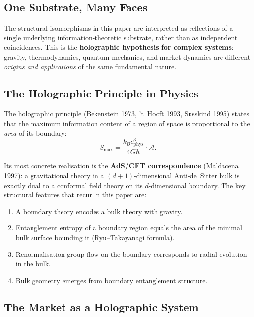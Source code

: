 \documentclass[12pt,a4paper]{article}
\begin{document}
\subsection{One Substrate, Many Faces}

The structural isomorphisms in this paper are interpreted as reflections
of a single underlying information-theoretic substrate, rather than as
independent coincidences. This is the \textbf{holographic hypothesis for
complex systems}: gravity, thermodynamics, quantum mechanics, and market
dynamics are different \emph{origins and applications} of the same
fundamental nature.

\subsection{The Holographic Principle in Physics}

The holographic principle (Bekenstein 1973, 't~Hooft 1993, Susskind 1995)
states that the maximum information content of a region of space is
proportional to the \emph{area} of its boundary:
\begin{equation}
    S_{\max} = \frac{k_B c_{\text{phys}}^3}{4G\hbar}\cdot\mathcal{A}.
\end{equation}

Its most concrete realisation is the \textbf{AdS/CFT correspondence}
(Maldacena 1997): a gravitational theory in a $(d+1)$-dimensional
Anti-de~Sitter bulk is exactly dual to a conformal field theory on its
$d$-dimensional boundary. The key structural features that recur in this
paper are:
\begin{enumerate}
    \item A boundary theory encodes a bulk theory with gravity.
    \item Entanglement entropy of a boundary region equals the area of
          the minimal bulk surface bounding it (Ryu--Takayanagi formula).
    \item Renormalisation group flow on the boundary corresponds to radial
          evolution in the bulk.
    \item Bulk geometry emerges from boundary entanglement structure.
\end{enumerate}

\subsection{The Market as a Holographic System}
\end{document}
